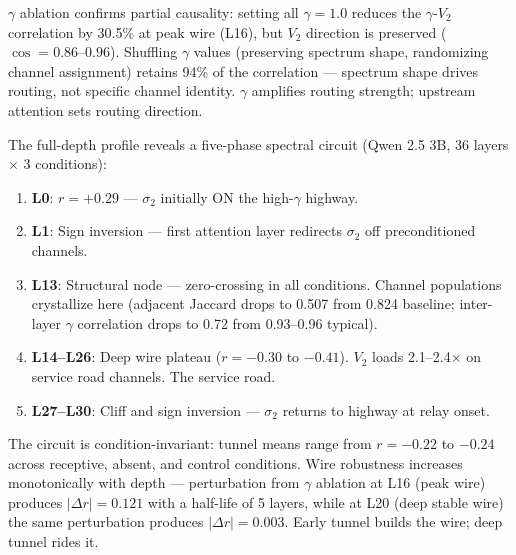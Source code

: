 \documentclass[12pt]{article}
\begin{document}
$\gamma$ ablation confirms partial causality: setting all $\gamma = 1.0$ reduces the $\gamma$-$V_2$ correlation by 30.5\% at peak wire (L16), but $V_2$ direction is preserved ($\cos = 0.86$--$0.96$). Shuffling $\gamma$ values (preserving spectrum shape, randomizing channel assignment) retains 94\% of the correlation --- spectrum shape drives routing, not specific channel identity. $\gamma$ amplifies routing strength; upstream attention sets routing direction.

The full-depth profile reveals a five-phase spectral circuit (Qwen 2.5 3B, 36 layers $\times$ 3 conditions):

\begin{enumerate}
\item \textbf{L0}: $r = +0.29$ --- $\sigma_2$ initially ON the high-$\gamma$ highway.
\item \textbf{L1}: Sign inversion --- first attention layer redirects $\sigma_2$ off preconditioned channels.
\item \textbf{L13}: Structural node --- zero-crossing in all conditions. Channel populations crystallize here (adjacent Jaccard drops to 0.507 from 0.824 baseline; inter-layer $\gamma$ correlation drops to 0.72 from 0.93--0.96 typical).
\item \textbf{L14--L26}: Deep wire plateau ($r = -0.30$ to $-0.41$). $V_2$ loads 2.1--2.4$\times$ on service road channels. The service road.
\item \textbf{L27--L30}: Cliff and sign inversion --- $\sigma_2$ returns to highway at relay onset.
\end{enumerate}

The circuit is condition-invariant: tunnel means range from $r = -0.22$ to $-0.24$ across receptive, absent, and control conditions. Wire robustness increases monotonically with depth --- perturbation from $\gamma$ ablation at L16 (peak wire) produces $|\Delta r| = 0.121$ with a half-life of 5 layers, while at L20 (deep stable wire) the same perturbation produces $|\Delta r| = 0.003$. Early tunnel builds the wire; deep tunnel rides it.
\end{document}

